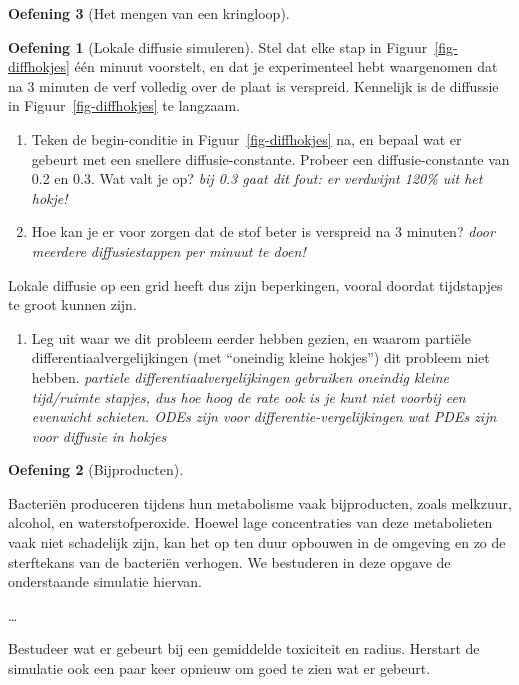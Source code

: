 \documentclass[
  a4paper,
]{scrbook}
\providecommand{\tightlist}{%
  \setlength{\itemsep}{0pt}\setlength{\parskip}{0pt}}\usepackage{longtable,booktabs,array}
\theoremstyle{definition}
\newtheorem{exercise}{Oefening}[chapter]
\theoremstyle{remark}
\begin{document}
\begin{exercise}[Het mengen van een
kringloop]
\begin{exercise}[Lokale diffusie
simuleren]
Stel dat elke stap in Figuur~\ref{fig-diffhokjes} één minuut voorstelt,
en dat je experimenteel hebt waargenomen dat na 3 minuten de verf
volledig over de plaat is verspreid. Kennelijk is de diffussie in
Figuur~\ref{fig-diffhokjes} te langzaam.

\begin{enumerate}
\def\labelenumi{\alph{enumi}.}
\tightlist
\item
  Teken de begin-conditie in Figuur~\ref{fig-diffhokjes} na, en bepaal
  wat er gebeurt met een snellere diffusie-constante. Probeer een
  diffusie-constante van 0.2 en 0.3. Wat valt je op? \emph{bij 0.3 gaat
  dit fout: er verdwijnt 120\% uit het hokje!}
\item
  Hoe kan je er voor zorgen dat de stof beter is verspreid na 3 minuten?
  \emph{door meerdere diffusiestappen per minuut te doen!}
\end{enumerate}

Lokale diffusie op een grid heeft dus zijn beperkingen, vooral doordat
tijdstapjes te groot kunnen zijn.

\begin{enumerate}
\def\labelenumi{\alph{enumi}.}
\setcounter{enumi}{2}
\tightlist
\item
  Leg uit waar we dit probleem eerder hebben gezien, en waarom partiële
  differentiaalvergelijkingen (met ``oneindig kleine hokjes'') dit
  probleem niet hebben. \emph{partiele differentiaalvergelijkingen
  gebruiken oneindig kleine tijd/ruimte stapjes, dus hoe hoog de rate
  ook is je kunt niet voorbij een evenwicht schieten. ODEs zijn voor
  differentie-vergelijkingen wat PDEs zijn voor diffusie in hokjes}
\end{enumerate}

\end{exercise}

\begin{exercise}[Bijproducten]\protect\hypertarget{exr-bijproducten}{}\label{exr-bijproducten}

Bacteriën produceren tijdens hun metabolisme vaak bijproducten, zoals
melkzuur, alcohol, en waterstofperoxide. Hoewel lage concentraties van
deze metabolieten vaak niet schadelijk zijn, kan het op ten duur
opbouwen in de omgeving en zo de sterftekans van de bacteriën verhogen.
We bestuderen in deze opgave de onderstaande simulatie hiervan.

\ldots{}

Bestudeer wat er gebeurt bij een gemiddelde toxiciteit en radius.
Herstart de simulatie ook een paar keer opnieuw om goed te zien wat er
gebeurt.


\end{exercise}
\end{exercise}
\end{document}
